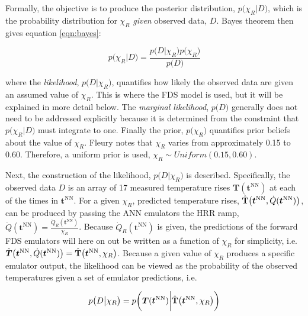 \documentclass{article}
\begin{document}
Formally, the objective is to produce the posterior distribution, $p\big(\chi_R|D\big)$, which is the probability distribution for $\chi_R$ \textit{given} observed data, $D$. Bayes theorem then gives equation \ref{eqn:bayes}:


 \begin{equation}
  \label{eqn:bayes}
  p\big(\chi_R|D\big) = \frac{p\big(D\big|\chi_R\big)p\big(\chi_R\big)}{p\big(D\big)}
\end{equation}


\noindent where the \textit{likelihood}, $p\big(D\big|\chi_R)$, quantifies how likely the observed data are given an assumed value of $\chi_R$. This is where the FDS model is used, but it will be explained in more detail below. The \textit{marginal likelihood}, $p\big(D\big)$ generally does not need to be addressed explicitly because it is determined from the constraint that $p\big(\chi_R|D\big)$ must integrate to one. Finally the prior, $p\big(\chi_R\big)$ quantifies prior beliefs about the value of $\chi_R$. Fleury \cite{fleury2010evaluation} notes that $\chi_R$ varies from approximately 0.15 to 0.60. Therefore, a uniform prior is used, $\chi_R \sim Uniform(0.15, 0.60)$. 

Next, the construction of the likelihood, $p\big(D\big|\chi_R\big)$ is described. Specifically, the observed data $D$ is an array of 17 measured temperature rises $\boldsymbol{T}(\boldsymbol{t}^\text{NN})$ at each of the times in $\boldsymbol{t}^\text{NN}$. For a given $\chi_R$, predicted temperature rises, $\hat{\bold{T}}\big(\boldsymbol{t}^\text{NN}, \dot{Q}(\boldsymbol{t}^\text{NN})\big)$, can be produced by passing the ANN emulators the HRR ramp, $\dot{Q}(\boldsymbol{t}^\text{NN}) = \frac{\dot{Q}_R(\boldsymbol{t}^\text{NN})}{\chi_R}$. Because $\dot{Q}_R(\boldsymbol{t}^\text{NN})$ is given, the predictions of the forward FDS emulators will here on out be written as a function of $\chi_R$ for simplicity, i.e. $\hat{\boldsymbol{T}}\big(\boldsymbol{t}^\text{NN}, \dot{Q}(\boldsymbol{t}^\text{NN})\big)  = \hat{\bold{T}}\big(\boldsymbol{t}^\text{NN}, \chi_R\big)$. Because a given value of $\chi_R$ produces a specific emulator output, the likelihood can be viewed as the probability of the observed temperatures given a set of emulator predictions, i.e.



 \begin{equation}
  \label{eqn:likelihood_reduced}
  p\big(D\big|\chi_R\big) = p\bigg(\boldsymbol{T}(\boldsymbol{t}^\text{NN}) \bigg| \hat{\bold{T}}\big(\boldsymbol{t}^\text{NN}, \chi_R\big)\bigg)
\end{equation}
\end{document}
